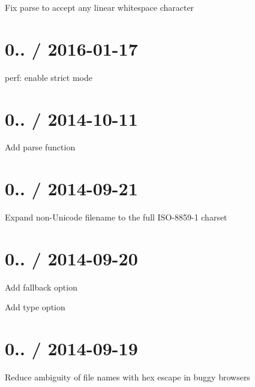 
\begin{DoxyItemize}
\item Fix {\ttfamily parse} to accept any linear whitespace character
\end{DoxyItemize}

\section*{0.. / 2016-\/01-\/17 }


\begin{DoxyItemize}
\item perf\+: enable strict mode
\end{DoxyItemize}

\section*{0.. / 2014-\/10-\/11 }


\begin{DoxyItemize}
\item Add {\ttfamily parse} function
\end{DoxyItemize}

\section*{0.. / 2014-\/09-\/21 }


\begin{DoxyItemize}
\item Expand non-\/\+Unicode {\ttfamily filename} to the full I\+S\+O-\/8859-\/1 charset
\end{DoxyItemize}

\section*{0.. / 2014-\/09-\/20 }


\begin{DoxyItemize}
\item Add {\ttfamily fallback} option
\item Add {\ttfamily type} option
\end{DoxyItemize}

\section*{0.. / 2014-\/09-\/19 }


\begin{DoxyItemize}
\item Reduce ambiguity of file names with hex escape in buggy browsers
\end{DoxyItemize}

